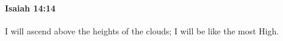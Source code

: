 
		\paragraph{Isaiah 14:14} %
			\label{ISAIAH-14-14}

			I will ascend above the heights of the clouds; I will be like the most High.


